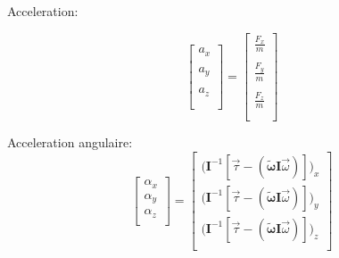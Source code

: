 \documentclass{article}
\begin{document}
Acceleration:

\begin{equation}
    \begin{bmatrix}
        a_x \\ \\
        a_y \\ \\
        a_z \\ \\
    \end{bmatrix}
=
\begin{bmatrix}
    \frac{F_x}{m} \\ \\
    \frac{F_y}{m} \\ \\
    \frac{F_z}{m} \\ \\
\end{bmatrix}
\end{equation}

Acceleration angulaire:
\begin{equation}
    \begin{bmatrix}
        \alpha_x \\
        \alpha_y \\
        \alpha_z \\
    \end{bmatrix}
=
\begin{bmatrix}
    \lparen\boldsymbol{I}^{-1}[\vec{\tau} - (\boldsymbol{\tilde{\omega}}\boldsymbol{I}\vec{\omega})]\rparen_x \\
    \lparen\boldsymbol{I}^{-1}[\vec{\tau} - (\boldsymbol{\tilde{\omega}}\boldsymbol{I}\vec{\omega})]\rparen_y \\
    \lparen\boldsymbol{I}^{-1}[\vec{\tau} - (\boldsymbol{\tilde{\omega}}\boldsymbol{I}\vec{\omega})]\rparen_z \\
\end{bmatrix}
\end{equation}
\end{document}
